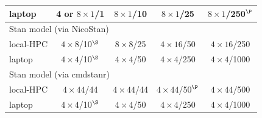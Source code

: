 \begin{table}[H]
{\begin{tabular}{lcccc}
laptop    & 4 or $8 \times 1$/1 & $8 \times 1$/10 & $8 \times 1$/25 & $8 \times 1$/250$^{\P}$ \\
\hline
\multicolumn{5}{l}{Stan model (via NicoStan)} \\
local-HPC & $4 \times 8$/10$^{\S}$ & $8 \times 8$/25 & $4 \times 16$/50 & $4 \times 16$/250 \\
laptop    & $4 \times 4$/10$^{\S}$ & $4 \times 4$/50 & $4 \times 4$/250 & $4 \times 4$/1000 \\
\hline
\multicolumn{5}{l}{Stan model (via cmdstanr)} \\
local-HPC & $4 \times 44$/44 & $4 \times 44$/44 & $4 \times 44$/50$^{\P}$ & $4 \times 44$/500 \\
laptop    & $4 \times 4$/10$^{\S}$ & $4 \times 4$/50 & $4 \times 4$/250 & $4 \times 4$/1000 \\
\hline
\end{tabular}
}
\end{table}
